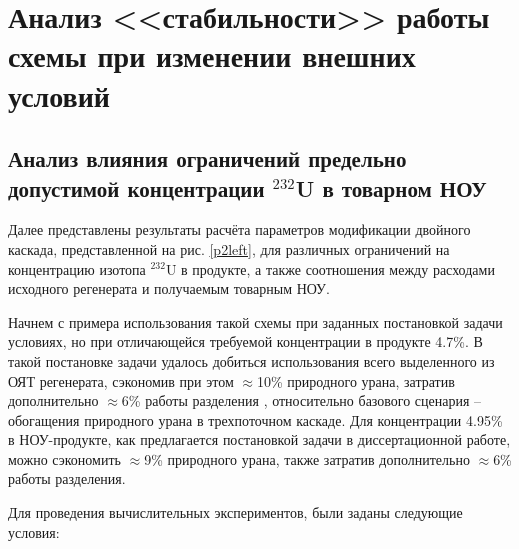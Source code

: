 \section{Анализ <<стабильности>> работы схемы при изменении внешних условий}
\subsection{Анализ влияния ограничений предельно допустимой концентрации $^{232}$U в товарном НОУ}

Далее представлены результаты расчёта параметров модификации двойного каскада, представленной на рис. \ref{p2left}, для различных ограничений на концентрацию изотопа $^{232}$U в продукте, а также соотношения между расходами исходного регенерата и получаемым товарным НОУ.

Начнем с примера использования такой схемы при заданных постановкой задачи условиях, но при отличающейся требуемой концентрации в продукте 4.7\%. В такой постановке задачи удалось добиться использования всего выделенного из ОЯТ регенерата, сэкономив при этом $\approx$10\% природного урана, затратив дополнительно $\approx$6\% работы разделения \cite{gusevMultycascadeEnrichmentSchemes2020}, относительно базового сценария -- обогащения природного урана в трехпоточном каскаде. Для концентрации 4.95\% в НОУ-продукте, как предлагается постановкой задачи в диссертационной работе, можно сэкономить  $\approx$9\% природного урана, также затратив дополнительно $\approx$6\% работы разделения.

Для проведения вычислительных экспериментов, были заданы следующие условия:

